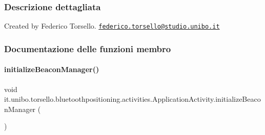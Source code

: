 \subsubsection{Descrizione dettagliata}
Created by Federico Torsello. \href{mailto:federico.torsello@studio.unibo.it}{\tt federico.\+torsello@studio.\+unibo.\+it} 

\subsubsection{Documentazione delle funzioni membro}
\hypertarget{classit_1_1unibo_1_1torsello_1_1bluetoothpositioning_1_1activities_1_1ApplicationActivity_a55d4f45ce163b9f613420686f6dfe1cf_a55d4f45ce163b9f613420686f6dfe1cf}{}\label{classit_1_1unibo_1_1torsello_1_1bluetoothpositioning_1_1activities_1_1ApplicationActivity_a55d4f45ce163b9f613420686f6dfe1cf_a55d4f45ce163b9f613420686f6dfe1cf} 
\paragraph{\texorpdfstring{initialize\+Beacon\+Manager()}{initializeBeaconManager()}}
{\footnotesize\ttfamily void it.\+unibo.\+torsello.\+bluetoothpositioning.\+activities.\+Application\+Activity.\+initialize\+Beacon\+Manager (\begin{DoxyParamCaption}{ }\end{DoxyParamCaption})\hspace{0.3cm}{\ttfamily [private]}}


